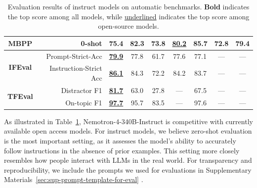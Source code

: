 \documentclass[11pt]{article}
\newcommand{\oursin}{Nemotron-4-340B-Instruct}
\begin{document}
\begin{table}[ht!]
{\begin{tabular}{crccccccc}
\midrule
\textbf{MBPP} & 0-shot & 75.4&82.3\footnotemark[5] &73.8\footnotemark[5] & \underline{80.2}& \textbf{85.7}\footnotemark[5] & 72.8\footnotemark[5] &79.4\\
\midrule
\multirow{2}{*}{\textbf{IFEval}} &Prompt-Strict-Acc & \underline{\textbf{79.9}} & 77.8 & 61.7 & 77.6 &77.1 & ---& --- \\
& Instruction-Strict Acc& \underline{\textbf{86.1}} &  84.3 & 72.2 & 84.2 &83.7 & ---& ---\\
\midrule
\multirow{2}{*}{\textbf{TFEval}\footnotemark[9]} & Distractor F1 & \underline{\textbf{81.7}} & 63.0 & 27.8& --- &67.5 & ---& ---\\
& On-topic F1 & \underline{\textbf{97.7}} &  95.7 & 83.5& --- &97.6 & ---& ---\\
\bottomrule
\end{tabular}
}

\caption{Evaluation results of instruct models on automatic benchmarks. \textbf{Bold} indicates the top score among all models, while \underline{underlined} indicates the top score among open-source models.}
\label{tab:chat-auto-eval}

\end{table}


As illustrated in Table~\ref{tab:chat-auto-eval}, \oursin{} is competitive with currently available open access models. For instruct models, we believe zero-shot evaluation is the most important setting, as it assesses the model's ability to accurately follow instructions in the absence of prior examples. This setting more closely resembles how people interact with LLMs in the real world. For transparency and reproducibility, we include the prompts we used for evaluations in Supplementary Materials~\ref{sec:sup-prompt-template-for-eval}
\footnotemark[1].





\end{document}
